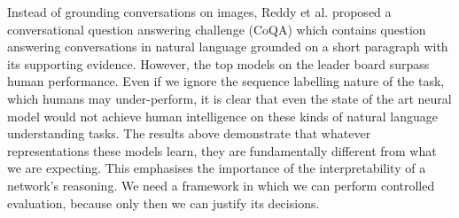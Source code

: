 \documentclass[bsc,frontabs,twoside,singlespacing,parskip,deptreport]{infthesis}     %
\begin{document}
Instead of grounding conversations on images, Reddy et al.\cite{reddy2019coqa} proposed a conversational question answering challenge (CoQA) which contains question answering conversations in natural language grounded on a short paragraph with its supporting evidence. However, the top models on the leader board surpass human performance. Even if we ignore the sequence labelling nature of the task, which humans may under-perform, it is clear that even the state of the art neural model would not achieve human intelligence on these kinds of natural language understanding tasks. The results above demonstrate that whatever representations these models learn, they are fundamentally different from what we are expecting. This emphasises the importance of the interpretability of a network's reasoning. We need a framework in which we can perform controlled evaluation, because only then we can justify its decisions.
\end{document}
